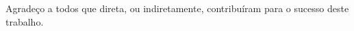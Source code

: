 %

\begin{agradecimentos}
	Agradeço a todos que direta, ou indiretamente, contribuíram para o sucesso deste trabalho.	
\end{agradecimentos}